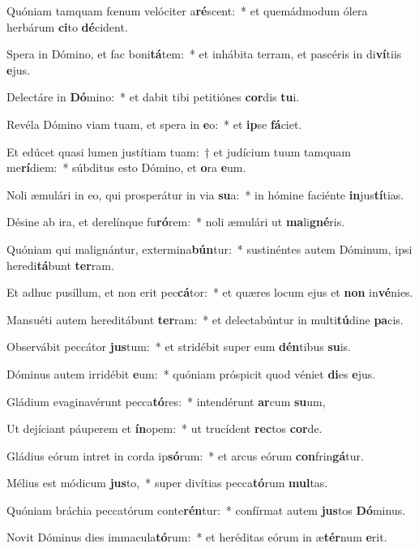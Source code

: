 \item Quóniam tamquam fœnum velóciter a\textbf{ré}scent:~* et quemádmodum ólera herbárum \textbf{ci}to \textbf{dé}cident.
\item Spera in Dómino, et fac boni\textbf{tá}tem:~* et inhábita terram, et pascéris in di\textbf{ví}tiis \textbf{e}jus.
\item Delectáre in \textbf{Dó}mino:~* et dabit tibi petitiónes \textbf{cor}dis \textbf{tu}i.
\item Revéla Dómino viam tuam, et spera in \textbf{e}o:~* et \textbf{ip}se \textbf{fá}ciet.
\item Et edúcet quasi lumen justítiam tuam:~† et judícium tuum tamquam me\textbf{rí}diem:~* súbditus esto Dómino, et \textbf{o}ra \textbf{e}um.
\item Noli æmulári in eo, qui prosperátur in via \textbf{su}a:~* in hómine faciénte \textbf{in}jus\textbf{tí}tias.
\item Désine ab ira, et derelínque fu\textbf{ró}rem:~* noli æmulári ut \textbf{ma}li\textbf{gné}ris.
\item Quóniam qui malignántur, extermina\textbf{bún}tur:~* sustinéntes autem Dóminum, ipsi heredi\textbf{tá}bunt \textbf{ter}ram.
\item Et adhuc pusíllum, et non erit pec\textbf{cá}tor:~* et quæres locum ejus et \textbf{non} in\textbf{vé}nies.
\item Mansuéti autem hereditábunt \textbf{ter}ram:~* et delectabúntur in multi\textbf{tú}dine \textbf{pa}cis.
\item Observábit peccátor \textbf{jus}tum:~* et stridébit super eum \textbf{dén}tibus \textbf{su}is.
\item Dóminus autem irridébit \textbf{e}um:~* quóniam próspicit quod véniet \textbf{di}es \textbf{e}jus.
\item Gládium evaginavérunt pecca\textbf{tó}res:~* intendérunt \textbf{ar}cum \textbf{su}um,
\item Ut dejíciant páuperem et \textbf{ín}opem:~* ut trucídent \textbf{rec}tos \textbf{cor}de.
\item Gládius eórum intret in corda ip\textbf{só}rum:~* et arcus eórum \textbf{con}frin\textbf{gá}tur.
\item Mélius est módicum \textbf{jus}to,~* super divítias pecca\textbf{tó}rum \textbf{mul}tas.
\item Quóniam bráchia peccatórum conte\textbf{rén}tur:~* confírmat autem \textbf{jus}tos \textbf{Dó}minus.
\item Novit Dóminus dies immacula\textbf{tó}rum:~* et heréditas eórum in æ\textbf{tér}num \textbf{e}rit.
